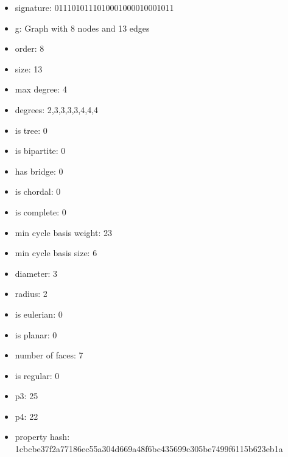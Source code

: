 \begin{itemize}
\item signature: 0111010111010001000010001011
\item g: Graph with 8 nodes and 13 edges
\item order: 8
\item size: 13
\item max degree: 4
\item degrees: 2,3,3,3,3,4,4,4
\item is tree: 0
\item is bipartite: 0
\item has bridge: 0
\item is chordal: 0
\item is complete: 0
\item min cycle basis weight: 23
\item min cycle basis size: 6
\item diameter: 3
\item radius: 2
\item is eulerian: 0
\item is planar: 0
\item number of faces: 7
\item is regular: 0
\item p3: 25
\item p4: 22
\item property hash: 1cbcbe37f2a77186ec55a304d669a48f6bc435699c305be7499f6115b623eb1a
\end{itemize}
\newpage
\begin{figure}
\end{figure}
